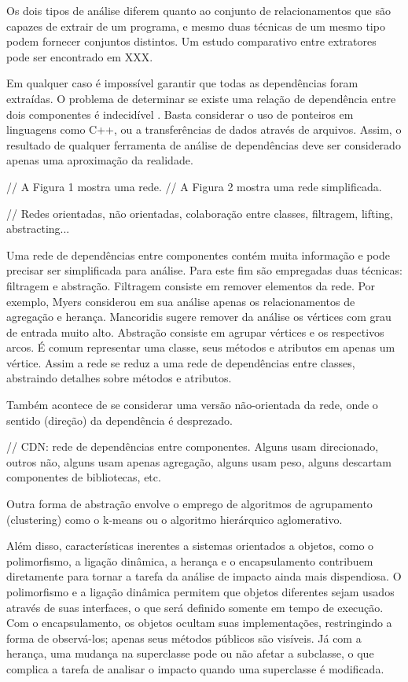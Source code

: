 \documentclass{article}
\begin{document}
Os dois tipos de análise diferem quanto ao conjunto de relacionamentos que são capazes de extrair de um programa, e mesmo duas técnicas de um mesmo tipo podem fornecer conjuntos distintos. Um estudo comparativo entre extratores pode ser encontrado em XXX. 

Em qualquer caso é impossível garantir que todas as dependências foram extraídas. O problema de determinar se existe uma relação de dependência entre dois componentes é indecidível \cite{Landi1992}. Basta considerar o uso de ponteiros em linguagens como C++, ou a transferências de dados através de arquivos. Assim, o resultado de qualquer ferramenta de análise de dependências deve ser considerado apenas uma aproximação da realidade.

// A Figura 1 mostra uma rede.
// A Figura 2 mostra uma rede simplificada.

// Redes orientadas, não orientadas, colaboração entre classes, filtragem, lifting, abstracting...

Uma rede de dependências entre componentes contém muita informação e pode precisar ser simplificada para análise. Para este fim são empregadas duas técnicas: filtragem e abstração. Filtragem consiste em remover elementos da rede. Por exemplo, Myers considerou em sua análise apenas os relacionamentos de agregação e herança. Mancoridis sugere remover da análise os vértices com grau de entrada muito alto. Abstração consiste em agrupar vértices e os respectivos arcos. É comum representar uma classe, seus métodos e atributos em apenas um vértice. Assim a rede se reduz a uma rede de dependências entre classes, abstraindo detalhes sobre métodos e atributos.

Também acontece de se considerar uma versão não-orientada da rede, onde o sentido (direção) da dependência é desprezado.

// CDN: rede de dependências entre componentes.
Alguns usam direcionado, outros não, alguns usam apenas agregação, alguns usam peso, alguns descartam componentes de bibliotecas, etc.


Outra forma de abstração envolve o emprego de algoritmos de agrupamento (clustering) como o k-means ou o algoritmo hierárquico aglomerativo.

    Além disso, características inerentes a sistemas orientados a objetos, como o polimorfismo, a ligação dinâmica, a herança e o encapsulamento contribuem diretamente para tornar a tarefa da análise de impacto ainda mais dispendiosa. O polimorfismo e a ligação dinâmica permitem que objetos diferentes sejam usados através de suas interfaces, o que será definido somente em tempo de execução. Com o encapsulamento, os objetos ocultam suas implementações, restringindo a forma de observá-los; apenas seus métodos públicos são visíveis. Já com a herança, uma mudança na superclasse pode ou não afetar a subclasse, o que complica a tarefa de analisar o impacto quando uma superclasse é modificada.
\end{document}
